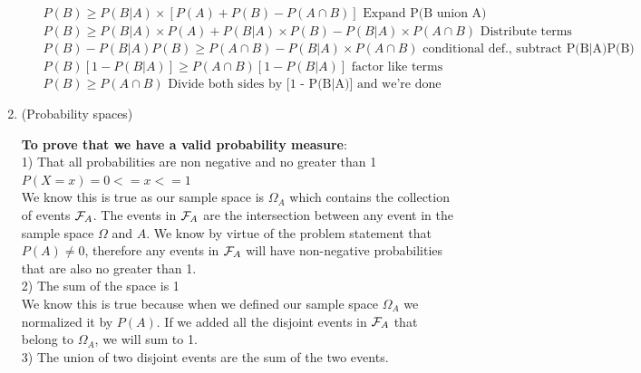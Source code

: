 \documentclass[12pt,twoside]{article}
\begin{document}
\begin{enumerate}
\begin{enumerate}
$
    {P(B)} \geq P(B|A) \times [P(A) + P(B) - P(A\cap B)] \text{ Expand P(B union A)}
$\\

$
    {P(B)} \geq P(B|A) \times P(A) + P(B|A) \times P(B) - P(B|A) \times P(A\cap B) \text{ Distribute terms}
$\\

$
    {P(B)}-P(B|A)P(B) \geq P(A\cap B) - P(B|A) \times P(A\cap B) \text{ conditional def., subtract P(B|A)P(B)}
$\\

$
    P(B)[1 - P(B|A)] \geq P(A\cap B)[1  - P(B|A)]  \text{ factor like terms}
$\\

$
    P(B) \geq P(A\cap B) \text{ Divide both sides by [1  - P(B|A)]  and we're done}
$\\







\end{enumerate}


\break

\item (Probability spaces)
 

\subitem
\textbf{To prove that we have a valid probability measure}:\\

1) That all probabilities are non negative and no greater than 1 $P(X=x) = 0<= x <=1$\\

We know this is true as our sample space is $\Omega _A$ which contains the collection of events $\mathcal{ F }_A$. The events in $\mathcal{ F }_A$ are the intersection between any event in the sample space $\Omega$ and $A$. We know by virtue of the problem statement that $P(A) \neq 0$, therefore any events in $\mathcal{ F }_A$ will have non-negative probabilities that are also no greater than 1.\\

2) The sum of the space is 1 \\

We know this is true because when we defined our sample space $\Omega _A$ we normalized it by $P(A)$. If we added all the disjoint events in $\mathcal{ F }_A$ that belong to $\Omega _A$, we will sum to 1. \\

3) The union of two disjoint events are the sum of the two events.\\


\end{enumerate}
\end{document}

